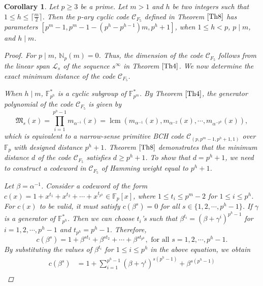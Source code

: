 \documentclass[pdflatex,sn-mathphys-num]{sn-jnl}%
\theoremstyle{thmstyleone}%
\newtheorem{corollary}{Corollary}%
\theoremstyle{thmstyletwo}%
\theoremstyle{thmstylethree}%
\begin{document}
\begin{corollary}
    Let $p\geq 3$ be a prime. Let $m>1$ and $h$ be two integers such that $1\leq h\leq \lceil\frac{m}{2}\rceil$. Then the $p$-ary cyclic code $\mathcal{C}_{F_{5}}$ defined in Theorem $\ref{Th8}$ has parameters $[p^m-1,p^m-1-(p^h-p^{h-1})m,p^h+1]$, when $1\leq h<p$, $p\mid m$, and $h\mid m$.
    \begin{proof}
       For $p\mid m$, $\mathbb{N}_{p}(m)=0$. Thus, the dimension of the code $\mathcal{C}_{F_{5}}$ follows from the linear span $\mathcal{L}_{s}$ of the sequence $s^{\infty}$ in Theorem $\ref{Th4}$. We now determine the exact minimum distance of the code $\mathcal{C}_{F_{5}}$. 
       \par When $h\mid m$, $\mathbb{F}_{p^h}^{*}$ is a cyclic subgroup of $\mathbb{F}_{p^m}^{*}$. By Theorem $\ref{Th4}$, the generator polynomial of the code $\mathcal{C}_{F_{5}}$ is given by 
        \begin{equation*}
            \mathfrak{M}_{s}(x)=\displaystyle\prod_{i=1}^{p^{h}-1}m_{\alpha^{-i}}(x)=\operatorname{lcm}\left(m_{\alpha^{-1}}(x),m_{\alpha^{-2}}(x),\cdots,m_{\alpha^{-p^{h}}}(x)\right),
        \end{equation*}
         which is equivalent to a narrow-sense primitive BCH code $\mathcal{C}_{(p,p^m-1,p^h+1,1)}$ over $\mathbb{F}_{p}$ with designed distance $p^h+1$. Theorem $\ref{Th8}$ demonstrates that the minimum distance $d$ of the code $\mathcal{C}_{F_{5}}$ satisfies $d\geq p^{h}+1$. To show that $d=p^{h}+1$, we need to construct a codeword in $\mathcal{C}_{F_{5}}$ of Hamming weight equal to $p^{h}+1$.
         \par Let $\beta=\alpha^{-1}$. Consider a codeword of the form $c(x)=1+x^{t_{1}}+x^{t_{2}}+\cdots+x^{t_{p^{h}}}\in\mathbb{F}_{p}[x]$, where $1\leq t_{i}\leq p^{m}-2$ for $1\leq i\leq p^{h}$. For $c(x)$ to be valid, it must satisfy $c(\beta^{s})=0$ for all $s\in\{1,2,\cdots,p^{h}-1\}$. If $\gamma$ is a generator of $\mathbb{F}_{p^h}^{*}$. Then we can choose $t_{i}$'s such that $\beta^{t_{i}}=(\beta+\gamma^{i})^{p^{h}-1}$ for $i=1,2,\cdots,p^h-1$ and $t_{p^h}=p^h-1$. Therefore, 
         \begin{equation*}
             c(\beta^s)=1+\beta^{st_{1}}+\beta^{st_{2}}+\cdots+\beta^{st_{p^h}}, \text{ for all }s=1,2,\cdots,p^h-1.
         \end{equation*}
         By substituting the values of $\beta^{t_{i}}$ for $1\leq i\leq p^h$ in the above equation, we obtain
         \begin{align*}
             c(\beta^s) &= 1+ \sum_{i=1}^{p^h-1}(\beta+\gamma^{i})^{s(p^h-1)}+\beta^{s(p^h-1)} \\

\end{align*}
\end{proof}
\end{corollary}
\end{document}
